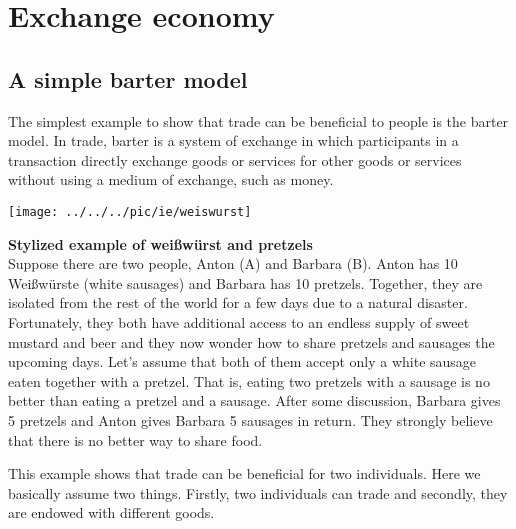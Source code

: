 {	
	
	
	\pbn
	\section{Exchange economy}\label{sec:exchange-economy}
	
	
	\subsection{A simple barter model}
	
	The simplest example to show that trade can be beneficial to people is the barter model. In trade, barter is a system of exchange in which participants in a transaction directly exchange goods or services for other goods or services without using a medium of exchange, such as money. 
	
	
	\begin{minipage}{0.4\linewidth}	\begin{center}
			\texttt{[image: ../../../pic/ie/weiswurst]}
		\end{center}
	\end{minipage}
	\begin{minipage}{0.6\linewidth}	\textbf{Stylized example of weißwürst and pretzels}\\
		Suppose there are two people, Anton (A) and Barbara (B). Anton has 10 Weißwürste (white sausages) and Barbara has 10 pretzels. Together, they are isolated from the rest of the world for a few days due to a natural disaster. Fortunately, they both have additional access to an endless supply of sweet mustard and beer and they now wonder how to share pretzels and sausages the upcoming days. Let's assume that both of them accept only a white sausage eaten together with a pretzel. That is, eating two pretzels with a sausage is no better than eating a pretzel and a sausage. After some discussion, Barbara gives 5 pretzels and Anton gives Barbara 5 sausages in return. They strongly believe that there is no better way to share food.
	\end{minipage}
	
	
	This example shows that trade can be beneficial for two individuals. Here we basically assume two things. Firstly, two individuals can trade and secondly, they are endowed with different goods. 
	
}

